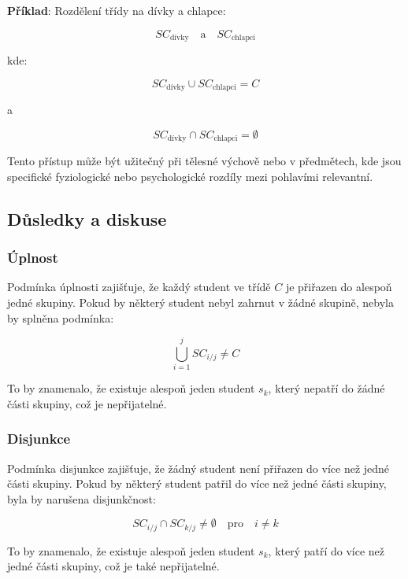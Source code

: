 \begin{samepage}
\setlength{\parindent}{0em}
\setlength{\parskip}{1em}

\textbf{Příklad}: Rozdělení třídy na dívky a chlapce:
\nopagebreak

\[
SC_{\text{dívky}} \quad \text{a} \quad SC_{\text{chlapci}}
\]
\nopagebreak

kde:
\nopagebreak

\[
SC_{\text{dívky}} \cup SC_{\text{chlapci}} = C
\]
\nopagebreak

a
\nopagebreak

\[
SC_{\text{dívky}} \cap SC_{\text{chlapci}} = \emptyset
\]

Tento přístup může být užitečný při tělesné výchově nebo v předmětech, kde jsou specifické fyziologické nebo psychologické rozdíly mezi pohlavími relevantní.
\end{samepage}

\subsection*{Důsledky a diskuse}

\subsubsection*{Úplnost}

Podmínka úplnosti zajišťuje, že každý student ve třídě \( C \) je přiřazen do alespoň jedné skupiny. Pokud by některý student nebyl zahrnut v žádné skupině, nebyla by splněna podmínka:

\[
\bigcup_{i=1}^{j} SC_{i/j} \neq C
\]

To by znamenalo, že existuje alespoň jeden student \( s_k \), který nepatří do žádné části skupiny, což je nepřijatelné.
\pagebreak
\begin{samepage}
\subsubsection*{Disjunkce}

Podmínka disjunkce zajišťuje, že žádný student není přiřazen do více než jedné části skupiny. Pokud by některý student patřil do více než jedné části skupiny, byla by narušena disjunkčnost:
\nopagebreak

\[
SC_{i/j} \cap SC_{k/j} \neq \emptyset \quad \text{pro} \quad i \neq k
\]
\nopagebreak

To by znamenalo, že existuje alespoň jeden student \( s_k \), který patří do více než jedné části skupiny, což je také nepřijatelné.
\end{samepage}

